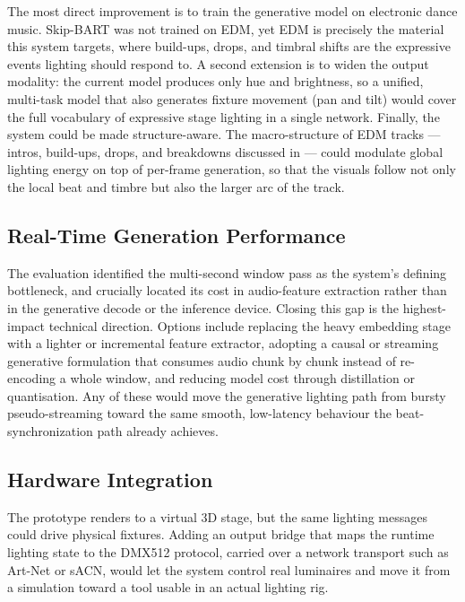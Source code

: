 The most direct improvement is to train the generative model on electronic dance music. Skip-BART was not trained on EDM, yet EDM is precisely the material this system targets, where build-ups, drops, and timbral shifts are the expressive events lighting should respond to. A second extension is to widen the output modality: the current model produces only hue and brightness, so a unified, multi-task model that also generates fixture movement (pan and tilt) would cover the full vocabulary of expressive stage lighting in a single network. Finally, the system could be made structure-aware. The macro-structure of EDM tracks --- intros, build-ups, drops, and breakdowns discussed in  --- could modulate global lighting energy on top of per-frame generation, so that the visuals follow not only the local beat and timbre but also the larger arc of the track.

\subsection{Real-Time Generation Performance}

The evaluation identified the multi-second window pass as the system's defining bottleneck, and crucially located its cost in audio-feature extraction rather than in the generative decode or the inference device. Closing this gap is the highest-impact technical direction. Options include replacing the heavy embedding stage with a lighter or incremental feature extractor, adopting a causal or streaming generative formulation that consumes audio chunk by chunk instead of re-encoding a whole window, and reducing model cost through distillation or quantisation. Any of these would move the generative lighting path from bursty pseudo-streaming toward the same smooth, low-latency behaviour the beat-synchronization path already achieves.

\subsection{Hardware Integration}

The prototype renders to a virtual 3D stage, but the same lighting messages could drive physical fixtures. Adding an output bridge that maps the runtime lighting state to the DMX512 protocol, carried over a network transport such as Art-Net or sACN, would let the system control real luminaires and move it from a simulation toward a tool usable in an actual lighting rig.

